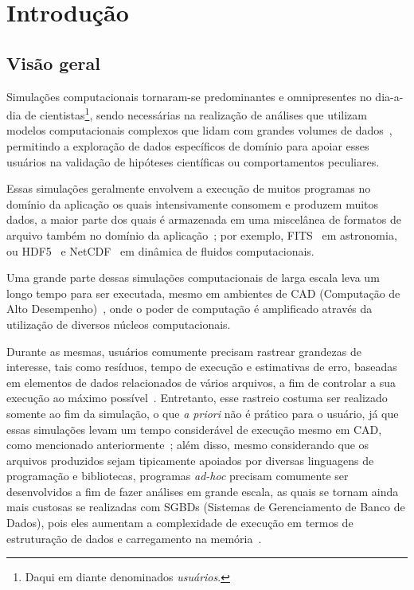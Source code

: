 
\chapter{Introdução}

\section{Visão geral}

Simulações computacionais tornaram-se predominantes e omnipresentes no dia-a-dia de cientistas\footnote{Daqui em diante denominados \textit{usuários}.}, sendo necessárias na realização de análises que utilizam modelos computacionais complexos que lidam com grandes volumes de dados~\cite{silva2015analyzing}, permitindo a exploração de dados específicos de domínio para apoiar esses usuários na validação de hipóteses científicas ou comportamentos peculiares.

Essas simulações geralmente envolvem a execução de muitos programas no domínio da aplicação os quais intensivamente consomem e produzem muitos dados, a maior parte dos quais é armazenada em uma miscelânea de formatos de arquivo também no domínio da aplicação~\cite{silva2015analyzing}; por exemplo,  FITS~\cite{greisen2002representations} em astronomia, ou  HDF5~\cite{hdfgroup2014hdf5} e  NetCDF~\cite{rew1990netcdf} em dinâmica de fluidos computacionais.

Uma grande parte dessas simulações computacionais de larga escala leva um longo tempo para ser executada, mesmo em ambientes de  CAD (Computação de Alto Desempenho)~\cite{silva2017raw}, onde o poder de computação é amplificado através da utilização de diversos núcleos computacionais.

Durante as mesmas, usuários comumente precisam rastrear grandezas de interesse, tais como resíduos, tempo de execução e estimativas de erro, baseadas em elementos de dados relacionados de vários arquivos, a fim de controlar a sua execução ao máximo possível~\cite{silva2016situ}.
Entretanto, esse rastreio costuma ser realizado somente ao fim da simulação, o que \textit{a priori} não é prático para o usuário, já que essas simulações levam um tempo considerável de execução mesmo em CAD, como mencionado anteriormente~\cite{silva2017raw}; além disso, mesmo considerando que os arquivos produzidos sejam tipicamente apoiados por diversas linguagens de programação e bibliotecas, programas \textit{ad-hoc} precisam comumente ser desenvolvidos a fim de fazer análises em grande escala, as quais se tornam ainda mais custosas se realizadas com  SGBDs (Sistemas de Gerenciamento de Banco de Dados), pois eles aumentam a complexidade de execução em termos de estruturação de dados e carregamento na memória~\cite{silva2015analyzing}.

